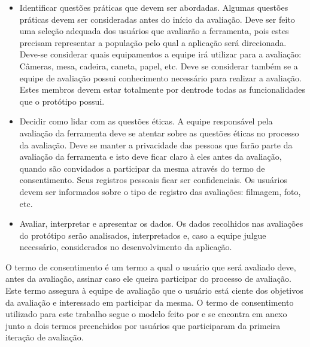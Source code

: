     \begin{itemize}
    
       \item Identificar questões práticas que devem ser abordadas.
       \subitem Algumas questões práticas devem ser consideradas antes do início da avaliação. Deve ser feito uma seleção adequada dos usuários 
       que avaliarão a ferramenta, pois estes precisam representar a população pelo qual a aplicação será direcionada. Deve-se considerar quais 
       equipamentos a equipe irá utilizar para a avaliação: Câmeras, mesa, cadeira, caneta, papel, etc. Deve se considerar também se a equipe
       de avaliação possui conhecimento necessário para realizar a avaliação. Estes membros devem estar totalmente por dentrode todas as 
       funcionalidades que o protótipo possui. 
       
    \end{itemize}
       
    \begin{itemize}
    
       \item Decidir como lidar com as questões éticas.
       \subitem A equipe responsável pela avaliação da ferramenta deve se atentar sobre as questões éticas no processo da avaliação. Deve se manter a 
       privacidade das pessoas que farão parte da avaliação da ferramenta e isto deve ficar claro à eles antes da avaliação, quando são convidados a 
       participar da mesma através do termo de consentimento. Seus registros pessoais ficar ser confidenciais. Os usuários devem ser informados sobre 
       o tipo de registro das avaliações: filmagem, foto, etc.
       
    \end{itemize}
       
    \begin{itemize}
    
       \item Avaliar, interpretar e apresentar os dados.
       \subitem Os dados recolhidos nas avaliações do protótipo serão analisados, interpretados e, caso a equipe julgue necessário, considerados no desenvolvimento da aplicação.
   
   \end{itemize}
   
	O termo de consentimento é um termo a qual o usuário que será avaliado deve, antes da avaliação, assinar caso ele queira participar do processo de avaliação. Este termo 
	assegura à equipe de avaliação que o usuário está ciente dos objetivos da avaliação e interessado em participar da mesma. O termo de consentimento utilizado para este trabalho
	segue o modelo feito por \cite{termoconsentimento} e se encontra em anexo junto a dois termos preenchidos por usuários que participaram da primeira iteração de avaliação.
	

